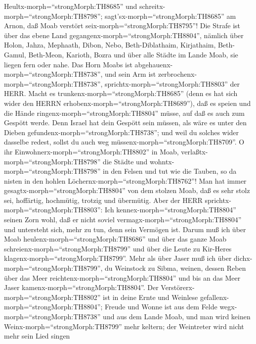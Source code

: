 Heultx-morph=``strongMorph:TH8685'' und
schreitx-morph=``strongMorph:TH8798'';
sagt'sx-morph=``strongMorph:TH8685'' am Arnon, daß Moab verstört
seix-morph=``strongMorph:TH8795''!  Die Strafe ist über das
ebene Land gegangenx-morph=``strongMorph:TH8804'', nämlich über Holon,
Jahza, Mephaath,  Dibon, Nebo, Beth-Diblathaim,
 Kirjathaim, Beth-Gamul, Beth-Meon,  Karioth,
Bozra und über alle Städte im Lande Moab, sie liegen fern oder nahe.
 Das Horn Moabs ist
abgehauenx-morph=``strongMorph:TH8738'', und sein Arm ist
zerbrochenx-morph=``strongMorph:TH8738'',
sprichtx-morph=``strongMorph:TH8803'' der HERR.  Macht es
trunkenx-morph=``strongMorph:TH8685'' (denn es hat sich wider den HERRN
erhobenx-morph=``strongMorph:TH8689''), daß es speien und die Hände
ringenx-morph=``strongMorph:TH8804'' müsse, auf daß es auch zum Gespött
werde.  Denn Israel hat dein Gespött sein müssen, als wäre
es unter den Dieben gefundenx-morph=``strongMorph:TH8738''; und weil du
solches wider dasselbe redest, sollst du auch weg
müssenx-morph=``strongMorph:TH8709''.  O ihr
Einwohnerx-morph=``strongMorph:TH8802'' in Moab,
verlaßtx-morph=``strongMorph:TH8798'' die Städte und
wohntx-morph=``strongMorph:TH8798'' in den Felsen und tut wie die
Tauben, so da nisten in den hohlen
Löchernx-morph=``strongMorph:TH8762''!  Man hat immer
gesagtx-morph=``strongMorph:TH8804'' von dem stolzen Moab, daß es sehr
stolz sei, hoffärtig, hochmütig, trotzig und übermütig. 
Aber der HERR sprichtx-morph=``strongMorph:TH8803'': Ich
kennex-morph=``strongMorph:TH8804'' seinen Zorn wohl, daß er nicht
soviel vermagx-morph=``strongMorph:TH8804'' und untersteht sich, mehr zu
tun, denn sein Vermögen ist.  Darum muß ich über Moab
heulenx-morph=``strongMorph:TH8686'' und über das ganze Moab
schreienx-morph=``strongMorph:TH8799'' und über die Leute zu Kir-Heres
klagenx-morph=``strongMorph:TH8799''.  Mehr als über Jaser
muß ich über dichx-morph=``strongMorph:TH8799'', du Weinstock zu Sibma,
weinen, dessen Reben über das Meer
reichtenx-morph=``strongMorph:TH8804'' und bis an das Meer Jaser
kamenx-morph=``strongMorph:TH8804''. Der
Verstörerx-morph=``strongMorph:TH8802'' ist in deine Ernte und Weinlese
gefallenx-morph=``strongMorph:TH8804'';  Freude und Wonne
ist aus dem Felde wegx-morph=``strongMorph:TH8738'' und aus dem Lande
Moab, und man wird keinen Weinx-morph=``strongMorph:TH8799'' mehr
keltern; der Weintreter wird nicht mehr sein Lied singen 

